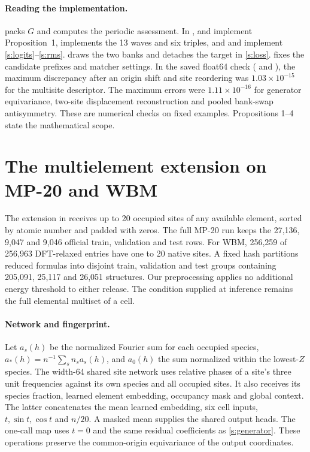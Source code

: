 \paragraph{Reading the implementation.}
 packs $G$ and computes the periodic assessment. In ,  and  implement Proposition~1,  implements the 13 waves and six triples, and  and  implement \eqref{s:logits}--\eqref{s:rms}.  draws the two banks and detaches the target in \eqref{s:loss}.  fixes the candidate prefixes and matcher settings. In the saved float64 check ( and ), the maximum discrepancy after an origin shift and site reordering was $1.03\times10^{-15}$ for the multisite descriptor. The maximum errors were $1.11\times10^{-16}$ for generator equivariance, two-site displacement reconstruction and pooled bank-swap antisymmetry. These are numerical checks on fixed examples. Propositions 1--4 state the mathematical scope.
\newpage
\section{The multielement extension on MP-20 and WBM}\label{s:scaled}
The extension in  receives up to 20 occupied sites of any available element, sorted by atomic number and padded with zeros. The full MP-20 run keeps the 27,136, 9,047 and 9,046 official train, validation and test rows. For WBM, 256,259 of 256,963 DFT-relaxed entries have one to 20 native sites. A fixed hash partitions reduced formulas into disjoint train, validation and test groups containing 205,091, 25,117 and 26,051 structures. Our preprocessing applies no additional energy threshold to either release. The condition supplied at inference remains the full elemental multiset of a cell.

\paragraph{Network and fingerprint.}
Let $a_s(h)$ be the normalized Fourier sum for each occupied species, $a_*(h)=n^{-1}\sum_s n_s a_s(h)$, and $a_0(h)$ the sum normalized within the lowest-$Z$ species. The width-64 shared site network uses relative phases of a site's three unit frequencies against its own species and all occupied sites. It also receives its species fraction, learned element embedding, occupancy mask and global context. The latter concatenates the mean learned embedding, six cell inputs, $t,\sin t,\cos t$ and $n/20$. A masked mean supplies the shared output heads. The one-call map uses $t=0$ and the same residual coefficients as \eqref{s:generator}. These operations preserve the common-origin equivariance of the output coordinates.

